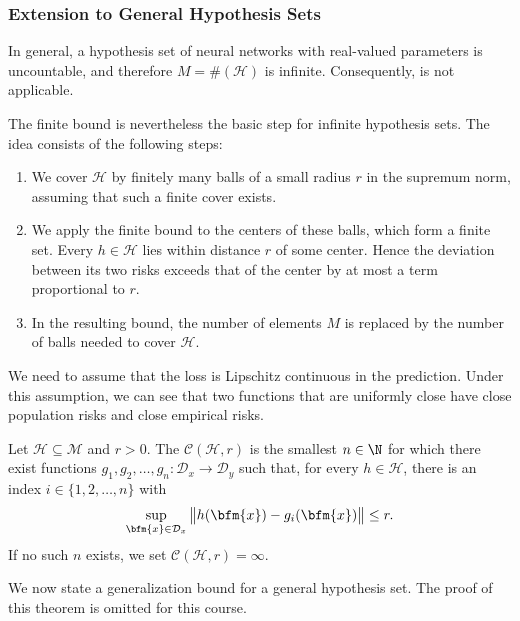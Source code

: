 \subsubsection{Extension to General Hypothesis Sets}
In general, a hypothesis set of neural networks with real-valued parameters is uncountable, and therefore $M=\#(\mathcal{H})$ is infinite. Consequently,  is not applicable.  

The finite bound is nevertheless the basic step for infinite hypothesis sets.  The idea consists of the following steps:  
\begin{enumerate}
\item We cover $\mathcal{H}$ by finitely many balls of a small radius $r$ in the supremum norm, assuming that such a finite cover exists.  
\item We apply the finite bound to the centers of these balls, which form a finite set.  Every $h\in\mathcal{H}$ lies within distance $r$ of some center.  Hence the deviation between its two risks exceeds that of the center by at most a term proportional to $r$.  
\item In the resulting bound, the number of elements $M$ is replaced by the number of balls needed to cover $\mathcal{H}$.
\end{enumerate}
We need to assume that the loss is Lipschitz continuous in the prediction.  Under this assumption, we can see that two functions that are uniformly close have close population risks and close empirical risks. 
\begin{definition}\label{covering.number.def}

Let $\mathcal{H}\subseteq\mathcal{M}$ and $r>0$.  The  $\mathscr{C}(\mathcal{H},r)$ is the smallest $n\in\N$ for which there exist functions $g_1,g_2,\ldots,g_n:\mathcal{D}_x\rightarrow \mathcal{D}_y$ such that, for every $h\in\mathcal{H}$, there is an index $i\in\{1,2,\ldots,n\}$ with
$$
\sup_{\bfm{x}\in\mathcal{D}_x}\big\|h(\bfm{x})-g_i(\bfm{x})\big\| \le r.
$$
If no such $n$ exists, we set $\mathscr{C}(\mathcal{H},r)=\infty$.
\end{definition}
We now state a generalization bound for a general hypothesis set. The proof of this theorem is omitted for this course.
